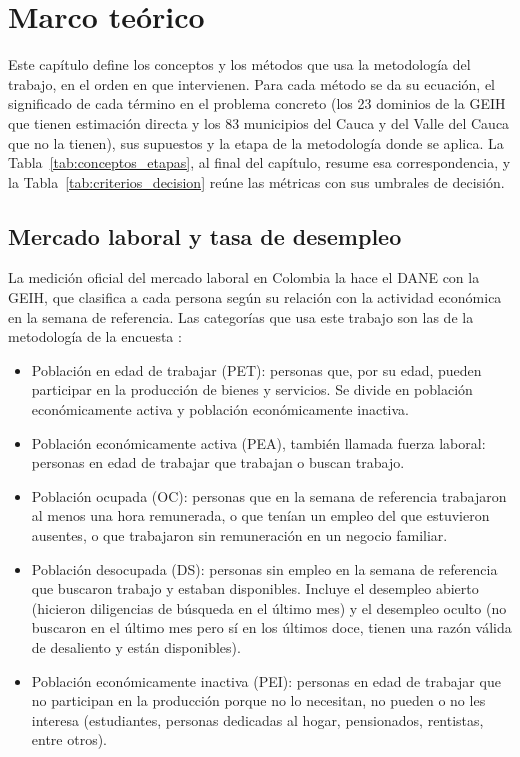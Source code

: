 

\label{sec:marco-referencia}

\section{Marco teórico}
\label{sec:marco-teorico}

Este capítulo define los conceptos y los métodos que usa la metodología del trabajo, en el orden en que intervienen. Para cada método se da su ecuación, el significado de cada término en el problema concreto (los 23 dominios de la GEIH que tienen estimación directa y los 83 municipios del Cauca y del Valle del Cauca que no la tienen), sus supuestos y la etapa de la metodología donde se aplica. La Tabla~\ref{tab:conceptos_etapas}, al final del capítulo, resume esa correspondencia, y la Tabla~\ref{tab:criterios_decision} reúne las métricas con sus umbrales de decisión.

\subsection{Mercado laboral y tasa de desempleo}

La medición oficial del mercado laboral en Colombia la hace el DANE con la GEIH, que clasifica a cada persona según su relación con la actividad económica en la semana de referencia. Las categorías que usa este trabajo son las de la metodología de la encuesta \cite[pp.~5--6, 20]{DANE_GEIH_Metodologia2016}:

\begin{itemize}
    \item Población en edad de trabajar (PET): personas que, por su edad, pueden participar en la producción de bienes y servicios. Se divide en población económicamente activa y población económicamente inactiva.
    \item Población económicamente activa (PEA), también llamada fuerza laboral: personas en edad de trabajar que trabajan o buscan trabajo.
    \item Población ocupada (OC): personas que en la semana de referencia trabajaron al menos una hora remunerada, o que tenían un empleo del que estuvieron ausentes, o que trabajaron sin remuneración en un negocio familiar.
    \item Población desocupada (DS): personas sin empleo en la semana de referencia que buscaron trabajo y estaban disponibles. Incluye el desempleo abierto (hicieron diligencias de búsqueda en el último mes) y el desempleo oculto (no buscaron en el último mes pero sí en los últimos doce, tienen una razón válida de desaliento y están disponibles).
    \item Población económicamente inactiva (PEI): personas en edad de trabajar que no participan en la producción porque no lo necesitan, no pueden o no les interesa (estudiantes, personas dedicadas al hogar, pensionados, rentistas, entre otros).
\end{itemize}

